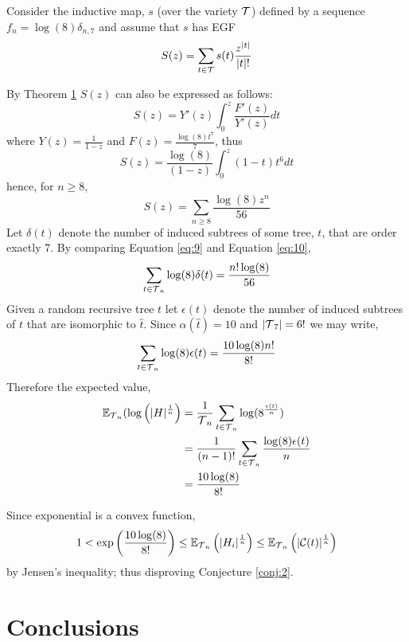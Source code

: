 Consider the inductive map, $s$  (over the variety $\operatorname{\mathcal{T}}$) defined by a sequence $f_n = \log(8)\delta_{n,7}$ and assume that $s$ has EGF
\begin{equation}\label{eq:9}
  S(z) = \sum_{t \in \operatorname{\mathcal{T}}} s(t)\frac{z^{\lvert t \rvert}}{\lvert t \rvert !}
\end{equation}


By Theorem \ref{} $S(z)$ can also be expressed as follows:
\[
 S(z) = Y'(z) \int_0^z \frac{F'(z)}{Y'(z)} dt
\]
where $Y(z) = \frac{1}{1-z}$ and $F(z) = \frac{\log(8)t^7}{7}$, thus
\[
 S(z) = \frac{\log(8)}{(1-z)}\int_0^z(1-t)t^6 dt
\]
hence, for $n \geq 8$,
\begin{equation}\label{eq:10}
 S(z) = \sum_{n \geq 8} \frac{\log(8)z^n}{56}
\end{equation}
Let $\delta(t)$ denote the number of induced subtrees of some tree, $t$, that are order exactly 7.  By comparing Equation \ref{eq:9} and Equation \ref{eq:10},
\[
 \sum_{t \in \operatorname{\mathcal{T}}_n}\log(8)\delta(t) = \frac{n!\log(8)}{56}
\]
Given a random recursive tree $t$ let $\epsilon(t)$ denote the number of induced subtrees of $t$ that are isomorphic to $\hat{t}$. Since $\alpha(\hat{t}) = 10$ and $\lvert \operatorname{\mathcal{T}}_7 \rvert = 6!$ we may write,
\[
 \sum_{t \in \operatorname{\mathcal{T}}_n}\log(8)\epsilon(t) = \frac{10\log(8)n!}{8!}
\]
Therefore the expected value, 
\begin{align}
 \mathbb{E}_{\operatorname{\mathcal{T}}_n}(\log\left(\lvert H \rvert^{\frac{1}{n}}\right) &= \frac{1}{\operatorname{\mathcal{T}}_n}\sum_{t \in \operatorname{\mathcal{T}}_n} \log(8^{\frac{\epsilon(t)}{n}}) \\
 &= \frac{1}{(n-1)!}\sum_{t \in \operatorname{\mathcal{T}}_n} \frac{\log(8)\epsilon(t)}{n} \\
 &= \frac{10\log(8)}{8!}
\end{align}

Since exponential is a convex function,
\[
 1 < \exp\left( \frac{10\log(8)}{8!}\right) \leq \mathbb{E}_{\operatorname{\mathcal{T}}_n}\left( \lvert H_i \rvert^{\frac{1}{n}}\right) \leq \mathbb{E}_{\operatorname{\mathcal{T}}_n} \left( \lvert \mathcal{C}(t) \rvert^{\frac{1}{n}}   \right)
\]
by Jensen's inequality; thus disproving Conjecture \ref{conj:2}.  
\section{Conclusions}

